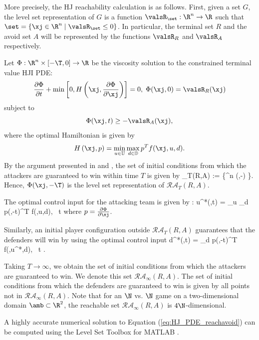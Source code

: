 More precisely, the HJ reachability calculation is as follows. 
First, given a set $G$, the level set representation of $G$ is a function $\valsR_\set:\R^n \rightarrow \R$ such that $\set = \left\{\xj\in\R^n \mid \valsR_\set\le0\right\}$.
In particular, the terminal set $R$ and the avoid set $A$ will be represented by the functions $\valsR_R$ and $\valsR_A$ respectively.

 
Let $\Phi:\R^n\times[-\T,0]\rightarrow\R$ be the viscosity solution \cite{j:Crandall-TAMS-1983} to the constrained terminal value HJI PDE:
\begin{equation}
	\label{eq:HJ_PDE_reachavoid}
	\frac{\partial \Phi}{\partial t} + \min \left[0, H\left(\xj,\frac{\partial \Phi}{\partial \xj}\right)\right] = 0,\;\Phi(\xj,0) = \valsR_R(\xj)	 
\end{equation}
subject to 
$$\Phi(\xj,t) \geq -\valsR_A(\xj),$$
where the optimal Hamiltonian is given by
$$H\left(\xj,p\right) = \min_{u \in \mathbb{U}} \max_{d \in \mathbb{D}} p^T f(\xj,u,d).$$
By the argument presented in \cite{j:mitchell-TAC-2005} and \cite{mitchell-thesis}, the set of initial conditions from which the attackers are guaranteed to win within time $T$ is given by 
\bq
{}_T(R,A) := \left\{\xj\in \R^n \mid \Phi (\xj,-\T) \right\}.
\eq
Hence, $\Phi (\xj,-\T)$ is the level set representation of $\mathcal{RA}_T(R,A)$.

The optimal control input for the attacking team is given by \cite{j:Lygeros-automatica-1999, j:Tomlin-ProcIEEE-2000, Huang2011}:
\bq \label{eq:opt_ctrl_u}
  u^*(\xj,t) = \arg \min_{u \in {}} \max_{d \in {}} p(\xj,-t)^T f(\xj,u,d), \!\ t \in [0,T] 
\eq
where $p = \frac{\partial \Phi}{\partial \xj}$. 

Similarly, an initial player configuration outside $\mathcal{RA}_T(R,A)$ guarantees that the defenders will win by using the optimal control input
\bq \label{eq:opt_ctrl_d}
  d^*(\xj,t) = \arg \max_{d \in {}} p(\xj,-t)^T f(\xj,u^*,d), \ t \in [0,T].
\eq

Taking $T\rightarrow\infty$, we obtain the set of initial conditions from which the attackers are guaranteed to win. We denote this set $\mathcal{RA}_\infty(R,A)$. The set of initial conditions from which the defenders are guaranteed to win is given by all points not in $\mathcal{RA}_\infty(R,A)$. Note that for an $\N$ vs. $\N$ game on a two-dimensional domain $\amb\subset\R^2$, the reachable set $\mathcal{RA}_\infty(R,A)$ is $4\N$-dimensional.

A highly accurate numerical solution to Equation (\ref{eq:HJ_PDE_reachavoid}) can be computed using the Level Set Toolbox for MATLAB \cite{LSToolbox}.

